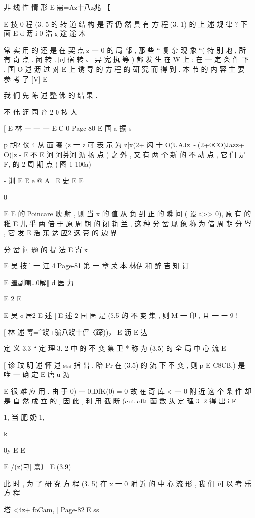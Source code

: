 {{非 线 性 情 形
E
需=Az十八z兆 【

E 技 0
程 (3. 5 的 转 道 结 构 是 否 仍 然 具 有 方 程 (3. 1) 的 上 述 规 律 ? 下 面
E d 沥 i
0 浩 g 途 途 木

常 实 用 的 还 是 在 契 点 z 一 0 的 局 部 , 那 些 “ 复 杂 现 象 “( 特 别 地 , 所
有 奇 点 . 闭 转 . 同 宿 转 、 异 宪 执 等 ) 都 发 生 在 W 上 ; 在 一 定 条 件 下 ,
国 O 述 沥
过 对 E 上 诱 导 的 方 程 的 研 究 而 得 到 . 本 节 的 内 容 主 要 参 考 了 [V]
E

我 们 先 陈 述 整 佛 的 结 果 .

不 伟 沥 园 育 2 0 技 人

[
E
林
一 一 一
E
C
0
Page-80
E 国 a 振 s

p 胡2 仪 4
从 面 硼 (z 一 z 可 表 示 为
z[x(2+ 闪 十 O(UAJz~- (2+0CO)Jazz+ O(|z[-
E 不
E 河 河芬河 沥 扬
点 ) 之 外 , 又 有 两 个 新 的 不 动 点 , 它 们 是 F, 的 2 周 期 点 ( 图 1-100a)

- 训
E
E
e @ A
\
E
史 E E

0

E
E
的 Poincare 映 射 , 则 当 x 的 值 从 负 到 正 的 瞬 间 ( 设 a>> 0), 原 有 的 稚
E
儿 乎 两 倍 于 原 周 期 的 闭 轨 兰 , 这 种 分 岔 现 象 称 为 借 周 期 分 岑 , 它 发
E 浩 东 达 应2
这 带 的 边 界

分 岔 问 题 的 提 法
E
寄 x [

E 吴 技 l 一 江 4
Page-81
第 一 章 荣 本 林伊 和 醉 吉 知 订

E 噩副嘲…0解‖ d 医 力

E 2
E

E 吴 c 居2 E 述
[
E 述 2 园 医
是 (3.5 的 不 变 集 , 则 M 一 印 , 且 一 一 9 !

[ 林 述
箐=^跷+骗八跷十俨〈蹄))， E 沥 E 达

定 义 3.3 “ 定 理 3. 2 中 的 不 变 集 卫 * 称 为 (3.5) 的 全 局 中 心 流
E

[ 诊 玟 明 述 怀 述 sss
指 出 , 眙 Pr 在 (3.5) 的 流 下 不 变 , 则 p E C8CB,) 是 唯 一 确 定
E 唐 u 沥

E
很 难 应 用 . 由 于 0) 一 0,DfK(0) = 0 故 在 奇 库 < 一 0 附 近 这 个 条
件 却 是 自 然 成 立 的 , 因 此 , 利 用 截 断 (cut-oftt 函 数 从 定 理 3. 2 得 出
i
E

1, 当 肥 奶 1,

k {0y E
E

E /(z)刁[ 熹〕 E (3.9)

此 时 , 为 了 研 究 方 程 (3. 5) 在 x 一 0 附 近 的 中 心 流 形 , 我 们 可 以 考
乐 方 程

塔 <4z+ foCam, [
Page-82
E ss

}}}
